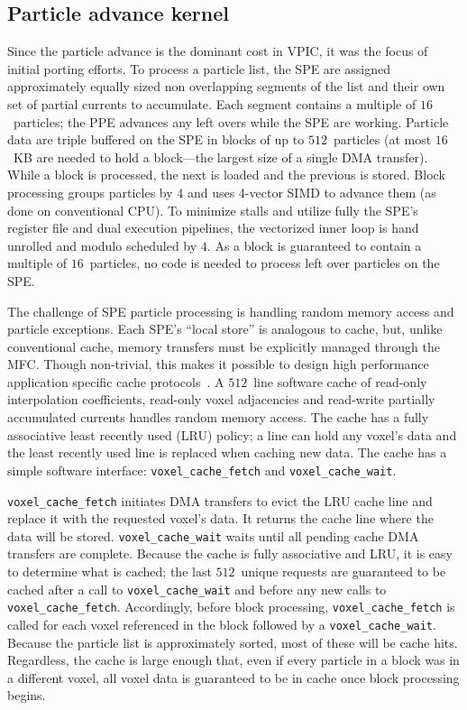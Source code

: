 \documentclass[journal,twoside]{IEEEtran}
\begin{document}
\subsection{Particle advance kernel}

Since the particle advance is the dominant cost in VPIC, it was the
focus of initial porting efforts.  To process a particle list, the SPE
are assigned approximately equally sized non overlapping segments of
the list and their own set of partial currents to accumulate.  Each
segment contains a multiple of $16$~particles; the PPE advances any
left overs while the SPE are working.  Particle data are triple
buffered on the SPE in blocks of up to $512$~particles (at most
$16$~KB are needed to hold a block---the largest size of a single DMA
transfer).  While a block is processed, the next is loaded and the
previous is stored.  Block processing groups particles by $4$ and uses
4-vector SIMD to advance them (as done on conventional CPU).  To
minimize stalls and utilize fully the SPE's register file and dual
execution pipelines, the vectorized inner loop is hand unrolled and
modulo scheduled by $4$.  As a block is guaranteed to contain a
multiple of $16$~particles, no code is needed to process left over
particles on the SPE.

The challenge of SPE particle processing is handling random memory
access and particle exceptions.  Each SPE's ``local store'' is
analogous to cache, but, unlike conventional cache, memory transfers
must be explicitly managed through the MFC.  Though non-trivial, this
makes it possible to design high performance application specific
cache protocols~\cite{Kahle_et_al_2005}.  A $512$~line software cache
of read-only interpolation coefficients, read-only voxel adjacencies
and read-write partially accumulated currents handles random memory
access.  The cache has a fully associative least recently used (LRU)
policy; a line can hold any voxel's data and the least recently used
line is replaced when caching new data.  The cache has a simple
software interface: \verb+voxel_cache_fetch+ and
\verb+voxel_cache_wait+.

\verb+voxel_cache_fetch+ initiates DMA transfers to evict the LRU
cache line and replace it with the requested voxel's data.  It returns
the cache line where the data will be stored.  \verb+voxel_cache_wait+
waits until all pending cache DMA transfers are complete.  Because the
cache is fully associative and LRU, it is easy to determine what is
cached; the last $512$~unique requests are guaranteed to be cached
after a call to \verb+voxel_cache_wait+ and before any new calls to
\verb+voxel_cache_fetch+.  Accordingly, before block processing,
\verb+voxel_cache_fetch+ is called for each voxel referenced in the
block followed by a \verb+voxel_cache_wait+.  Because the particle
list is approximately sorted, most of these will be cache hits.
Regardless, the cache is large enough that, even if every particle in
a block was in a different voxel, all voxel data is guaranteed to be
in cache once block processing begins.
\end{document}
